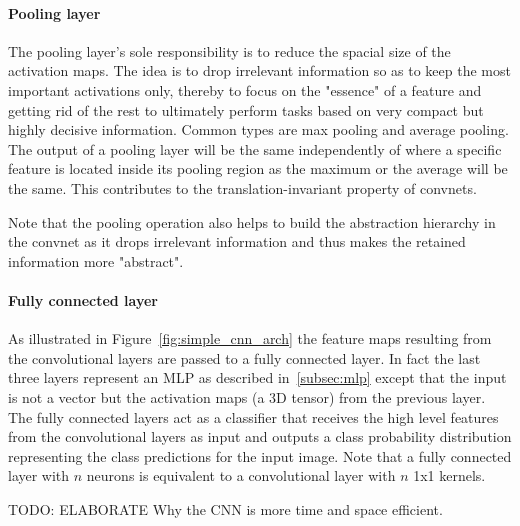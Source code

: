 \documentclass[12pt,a4paper]{article}
\begin{document}
\paragraph{Pooling layer            } The pooling layer's sole responsibility is to reduce the spacial size of the activation maps. The idea is to drop irrelevant information so as to keep the most important activations only, thereby to focus on the "essence" of a feature and getting rid of the rest to ultimately perform tasks based on very compact but highly decisive information. Common types are max pooling and average pooling. The output of a pooling layer will be the same independently of where a specific feature is located inside its pooling region as the maximum or the average will be the same. This contributes to the translation-invariant property of convnets.
\par Note that the pooling operation also helps to build the abstraction hierarchy in the convnet as it drops irrelevant information and thus makes the retained information more "abstract". 

\paragraph{Fully connected layer    } As illustrated in Figure~\ref{fig:simple_cnn_arch} the feature maps resulting from the convolutional layers are passed to a fully connected layer. In fact the last three layers represent an MLP as described in~\ref{subsec:mlp} except that the input is not a vector but the activation maps (a 3D tensor) from the previous layer. The fully connected layers act as a classifier that receives the high level features from the convolutional layers as input and outputs a class probability distribution representing the class predictions for the input image. Note that a fully connected layer with $n$ neurons is equivalent to a convolutional layer with $n$ 1x1 kernels.

TODO: ELABORATE Why the CNN is more time and space efficient.
\end{document}
